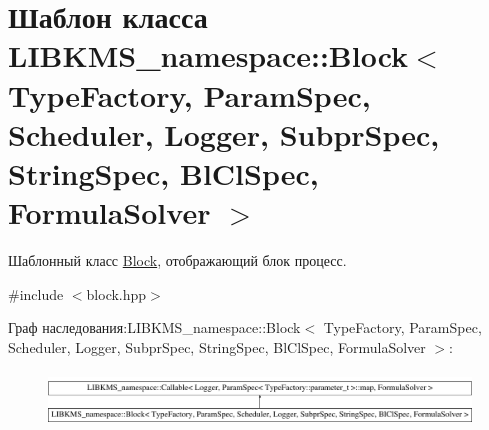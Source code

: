 \hypertarget{classLIBKMS__namespace_1_1Block}{\section{Шаблон класса L\-I\-B\-K\-M\-S\-\_\-namespace\-:\-:Block$<$ Type\-Factory, Param\-Spec, Scheduler, Logger, Subpr\-Spec, String\-Spec, Bl\-Cl\-Spec, Formula\-Solver $>$}
\label{classLIBKMS__namespace_1_1Block}
}


Шаблонный класс \hyperlink{classLIBKMS__namespace_1_1Block}{Block}, отображающий блок процесс.  




{\ttfamily \#include $<$block.\-hpp$>$}

Граф наследования\-:L\-I\-B\-K\-M\-S\-\_\-namespace\-:\-:Block$<$ Type\-Factory, Param\-Spec, Scheduler, Logger, Subpr\-Spec, String\-Spec, Bl\-Cl\-Spec, Formula\-Solver $>$\-:\begin{figure}[H]
\begin{center}
\leavevmode
\includegraphics[height=1.483444cm]{classLIBKMS__namespace_1_1Block}
\end{center}
\end{figure}
